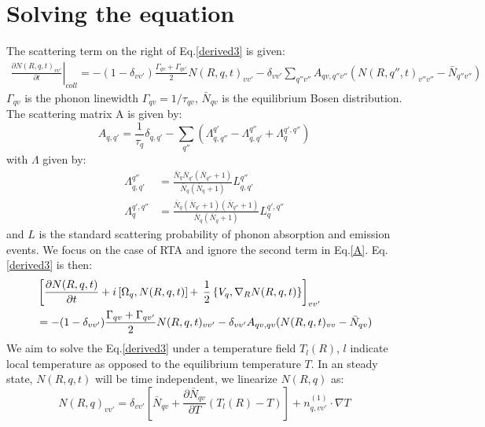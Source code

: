 \documentclass{article}
\begin{document}
\section{Solving the equation}
The scattering term on the right of Eq.\ref{derived3} is given:
\begin{align}
    \left. \frac{\partial N(R,q,t)_{vv'} }{\partial t} \right|_{coll} 
    = - (1-\delta_{vv'}) \frac{\Gamma_{qv} + \Gamma_{qv'}}{2} N(R,q,t)_{vv'} 
      - \delta_{vv'} \sum_{q''v''} A_{qv,q''v''}  (N(R,q'',t)_{v''v''} - \bar{N}_{q''v''} )
\end{align}
$\Gamma_{qv}$ is the phonon linewidth $\Gamma_{qv} = 1 / \tau_{qv}$, 
$\bar{N}_{qv}$ is the equilibrium Bosen distribution. The scattering matrix A is given by:
\begin{equation}
    A_{q,q'} = \frac{1}{\tau_{q}} \delta_{q,q'} 
            - \sum_{q''} \left( \Lambda_{q,q''}^{q'} -  \Lambda_{q,q'}^{q''} + \Lambda^{q',q''}_{q} \right) \label{A}
\end{equation}
with $\Lambda$ given by:
\begin{align}
    \Lambda_{q,q'}^{q''} &= \frac{\bar{N}_{q} \bar{N}_{q'} (\bar{N}_{q''} + 1)}{\bar{N}_{q} (\bar{N}_{q} + 1)} L_{q,q'}^{q''} \\
    \Lambda^{q',q''}_{q} &= \frac{\bar{N}_{q} (\bar{N}_{q'}+1) (\bar{N}_{q''} + 1)}{\bar{N}_{q} (\bar{N}_{q} + 1)} L^{q',q''}_{q} 
\end{align}
and $L$ is the standard scattering probability of phonon absorption and emission events.
We focus on the case of RTA and ignore the second term in Eq.\ref{A}. Eq.\ref{derived3} is then:
\begin{align}
    &\left[ \frac{\partial N(R,q,t)}{\partial t} + i \left[ \Omega_{q},N(R,q,t) \right] + \right.
      \left.  \frac{1}{2} \left\{ V_{q}, \nabla_R N(R,q,t) \right\} \right]_{vv'} \notag \\
        &=  - (1-\delta_{vv'}) \frac{\Gamma_{qv} + \Gamma_{qv'}}{2} N(R,q,t)_{vv'} 
           - \delta_{vv'} A_{qv,qv} (N(R,q,t)_{vv} - \bar{N}_{qv} ) \label{final}
\end{align}
We aim to solve the Eq.\ref{derived3} under a temperature field $T_l(R)$, $l$ indicate local temperature 
as opposed to the equilibrium temperature $T$. In an steady state, $N(R,q,t)$ will be time independent, we 
linearize $N(R,q)$ as:
\begin{equation}
    N(R,q)_{vv'} = \delta_{vv'} \left[ \bar{N}_{qv} + \frac{\partial \bar{N}_{qv}}{\partial T} (T_l(R)-T) \right] + n^{(1)}_{q,vv'} \cdot \nabla T \label{linear}
\end{equation}
\end{document}
